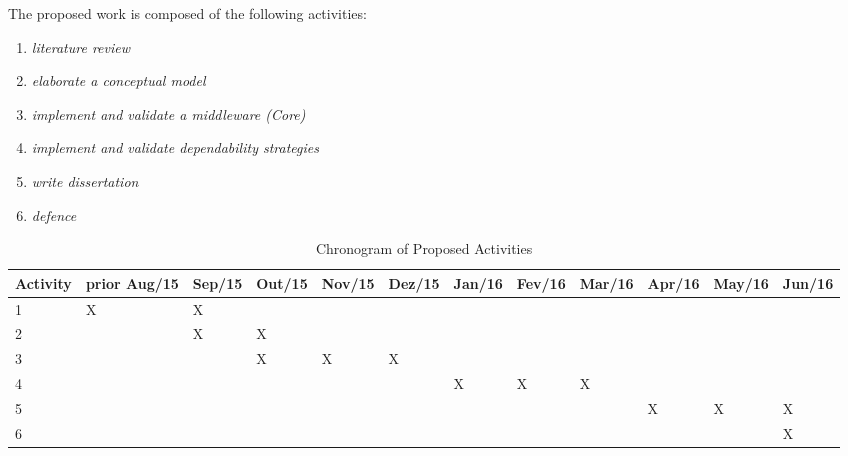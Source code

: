 The proposed work is composed of the following activities:

\begin{enumerate}
\item \emph{literature review}
\item \emph{elaborate a conceptual model}
\item \emph{implement and validate a middleware (Core)}
\item \emph{implement and validate dependability strategies}
\item \emph{write dissertation}
\item \emph{defence}


\end{enumerate}

\begin{table}[htbp]
\tiny
\begin{flushleft}
\begin{tabular}{|p{1.1cm}|p{0.75cm}|p{0.75cm}|p{0.75cm}|p{0.75cm}|p{0.75cm}|p{0.75cm}|p{0.75cm}|p{0.75cm}|p{0.75cm}|p{0.75cm}|p{0.75cm}|}
\hline
\textbf{Activity}&	\textbf{prior Aug/15}&	\textbf{Sep/15}&	\textbf{Out/15}&	\textbf{Nov/15}&	\textbf{Dez/15}&	\textbf{Jan/16}&	\textbf{Fev/16}&	\textbf{Mar/16}&	\textbf{Apr/16}&	\textbf{May/16}&	\textbf{Jun/16}\\
\hline	1			&	X	&	 X  &	 		&			&		&		&	 		&	 		&	 	&		 &				\\
\hline	2			&		&	 X	&	 X	&			&		&		&	 		&	 		&	 	&		 &				\\
\hline	3			&		&	  	&	 X	&	X	  &	X	&		&	 	  &	   	&	 	&		 &				\\
\hline	4			&		&	 		&	 		&			&		&	X	&	 X	&	 X	&	  &		 &				\\
\hline	5			&		&	 		&	 		&			&		&		&	 		&	 		&	X	&	X	 &	X			\\
\hline	6			&		&	 		&	 		&			&		&		&	 		&	 		&	  &		 &	X			\\
\hline
\end{tabular}
\end{flushleft}
\caption{Chronogram of Proposed Activities}
\label{tbcrono}
\end{table}
